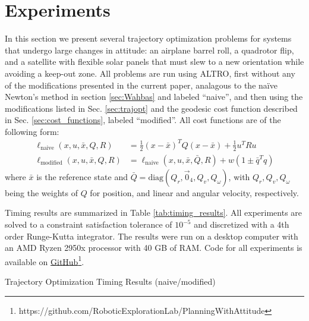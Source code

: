 \documentclass[letterpaper, 10 pt, conference]{ieeeconf}  %
\newcommand{\half}{\frac{1}{2}}
\newcommand{\todo}[1]{\textcolor{red}{TODO: #1}}
\begin{document}

\section{Experiments} \label{sec:experiments}
    In this section we present several trajectory optimization problems for systems that
    undergo large changes in attitude: an airplane barrel roll, a quadrotor flip, and a
    satellite with flexible solar panels that must slew to a new orientation while
    avoiding a keep-out zone.    
    All problems are run using ALTRO, first without any of the modifications presented in
    the current paper, analagous to the na\"ive Newton's method in section \ref{sec:Wahbas}
    and labeled ``naive'', and then using the modifications listed in Sec.
    \ref{sec:trajopt} and the geodesic cost function described in Sec.
    \ref{sec:cost_functions}, labeled ``modified''. All cost functions are of the
    following form:
    \begin{align}
        \ell_\text{naive}(x, u, \bar{x}, Q, R) &= \half (x - \bar{x})^T Q (x - \bar{x}) + \half u^T R u \\
        \ell_\text{modified}(x, u, \bar{x}, Q, R) 
            &= \ell_\text{naive}(x, u, \bar{x}, \bar{Q}, R) + w (1 \pm \bar{q}^T q)
    \end{align}
    where $\bar{x}$ is the reference state and $\bar{Q} = \text{diag}(Q_r, \vec{0}_4,
    Q_v, Q_\omega)$, with $Q_r,Q_v,Q_\omega$ being the weights of $Q$ for position, and
    linear and angular velocity, respectively.
    
    Timing results are summarized in Table \ref{tab:timing_results}. All experiments are 
    solved to a constraint satisfaction tolerance of $10^{-5}$ and discretized with a 4th 
    order Runge-Kutta integrator. The results were run on a desktop computer with an AMD
    Ryzen 2950x processor with 40 GB of RAM. Code for all experiments is available on
    \href{https://github.com/RoboticExplorationLab/PlanningWithAttitude}
    {GitHub\footnote{\url{https://github.com/RoboticExplorationLab/PlanningWithAttitude}}}.

    \begin{table}
        \centering
        
        \label{tab:timing_results}
        \caption{Trajectory Optimization Timing Results (naive/modified)}
    \end{table}
        
\end{document}

